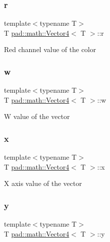 \subsubsection{\texorpdfstring{r}{r}}
{\footnotesize\ttfamily template$<$typename T$>$ \\
T \mbox{\hyperlink{structpad_1_1math_1_1_vector4}{pad\+::math\+::\+Vector4}}$<$ T $>$\+::r}

Red channel value of the color \mbox{\label{structpad_1_1math_1_1_vector4_abbbd617d5083a886936724282216bee4}} 
\subsubsection{\texorpdfstring{w}{w}}
{\footnotesize\ttfamily template$<$typename T$>$ \\
T \mbox{\hyperlink{structpad_1_1math_1_1_vector4}{pad\+::math\+::\+Vector4}}$<$ T $>$\+::w}

W value of the vector \mbox{\label{structpad_1_1math_1_1_vector4_a977619c0dbd2e7060bb1f839d3fa8337}} 
\subsubsection{\texorpdfstring{x}{x}}
{\footnotesize\ttfamily template$<$typename T$>$ \\
T \mbox{\hyperlink{structpad_1_1math_1_1_vector4}{pad\+::math\+::\+Vector4}}$<$ T $>$\+::x}

X axis value of the vector \mbox{\label{structpad_1_1math_1_1_vector4_a2461711530968b1c7c5ff1256a5a6098}} 
\subsubsection{\texorpdfstring{y}{y}}
{\footnotesize\ttfamily template$<$typename T$>$ \\
T \mbox{\hyperlink{structpad_1_1math_1_1_vector4}{pad\+::math\+::\+Vector4}}$<$ T $>$\+::y}


